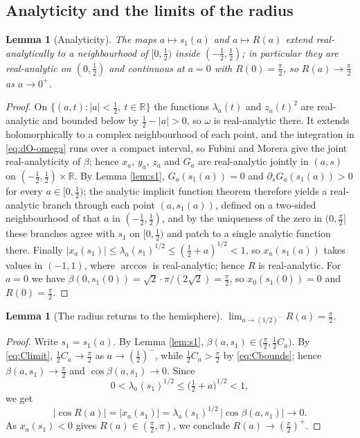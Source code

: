 \documentclass[10pt,a4paper]{amsart}
\newtheorem{lemma}[theorem]{Lemma}
\newcommand{\R}{\mathbb{R}}
\begin{document}
\subsection*{Analyticity and the limits of the radius}

\begin{lemma}[Analyticity]\label{lem:analytic}
The maps $a\mapsto s_1(a)$ and $a\mapsto R(a)$ extend real-analytically to a neighbourhood of $[0,\tfrac12)$ inside $(-\tfrac12,\tfrac12)$; in particular they are real-analytic on $(0,\tfrac12)$ and continuous at $a=0$ with $R(0)=\tfrac\pi2$, so $R(a)\to\tfrac\pi2$ as $a\to 0^+$.
\end{lemma}

\begin{proof}
On $\{(a,t):|a|<\tfrac12,\ t\in\R\}$ the functions $\lambda_a(t)$ and $z_a(t)^2$ are real-analytic and bounded below by $\tfrac12-|a|>0$, so $\omega$ is real-analytic there. It extends holomorphically to a complex neighbourhood of each point, and the integration in \eqref{eq:dO-omega} runs over a compact interval, so Fubini and Morera give the joint real-analyticity of $\beta$; hence $x_a$, $y_a$, $z_a$ and $G_a$ are real-analytic jointly in $(a,s)$ on $(-\tfrac12,\tfrac12)\times\R$. By Lemma \ref{lem:s1}, $G_a(s_1(a))=0$ and $\partial_sG_a(s_1(a))>0$ for every $a\in[0,\tfrac12)$; the analytic implicit function theorem therefore yields a real-analytic branch through each point $(a,s_1(a))$, defined on a two-sided neighbourhood of that $a$ in $(-\tfrac12,\tfrac12)$, and by the uniqueness of the zero in $(0,\tfrac\pi2]$ these branches agree with $s_1$ on $[0,\tfrac12)$ and patch to a single analytic function there. Finally $|x_a(s_1)|\leq\lambda_a(s_1)^{1/2}\leq(\tfrac12+a)^{1/2}<1$, so $x_a(s_1(a))$ takes values in $(-1,1)$, where $\arccos$ is real-analytic; hence $R$ is real-analytic. For $a=0$ we have $\beta(0,s_1(0))=\sqrt2\cdot\pi/(2\sqrt2)=\tfrac\pi2$, so $x_0(s_1(0))=0$ and $R(0)=\tfrac\pi2$.
\end{proof}

\begin{lemma}[The radius returns to the hemisphere]\label{lem:return}
$\displaystyle\lim_{a\to(1/2)^-}R(a)=\frac\pi2 .$
\end{lemma}

\begin{proof}
Write $s_1=s_1(a)$. By Lemma \ref{lem:s1}, $\beta(a,s_1)\in\bigl(\tfrac\pi2,\tfrac12C_a\bigr)$. By \eqref{eq:Climit}, $\tfrac12C_a\to\tfrac\pi2$ as $a\to(\tfrac12)^-$, while $\tfrac12 C_a>\tfrac\pi2$ by \eqref{eq:Cbounds}; hence $\beta(a,s_1)\to\tfrac\pi2$ and $\cos\beta(a,s_1)\to 0$. Since
\[
0<\lambda_a(s_1)^{1/2}\leq\bigl(\tfrac12+a\bigr)^{1/2}<1,
\]
we get
\[
\bigl|\cos R(a)\bigr|=\bigl|x_a(s_1)\bigr|=\lambda_a(s_1)^{1/2}\,\bigl|\cos\beta(a,s_1)\bigr|\longrightarrow 0 .
\]
As $x_a(s_1)<0$ gives $R(a)\in(\tfrac\pi2,\pi)$, we conclude $R(a)\to(\tfrac\pi2)^+$.
\end{proof}
\end{document}
